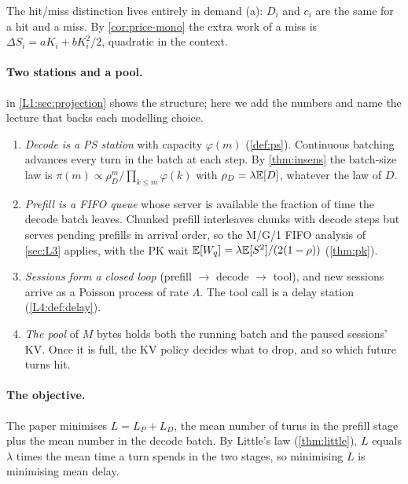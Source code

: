 The hit/miss distinction lives entirely in demand (a): $D_i$ and $c_i$ are
the same for a hit and a miss. By \cref{cor:price-mono} the extra work of a
miss is $\Delta S_i=aK_i+bK_i^2/2$, quadratic in the context.

\paragraph{Two stations and a pool.}  in
\cref{L1:sec:projection} shows the structure; here we add the numbers and
name the lecture that backs each modelling choice.
\begin{enumerate}
\item \emph{Decode is a PS station} with capacity $\varphi(m)$
  (\cref{def:ps}). Continuous batching advances every turn in the batch at
  each step. By \cref{thm:insens} the batch-size law is
  $\pi(m)\propto\rho_D^m/\prod_{k\le m}\varphi(k)$ with $\rho_D=\lambda\mathbb{E}[D]$,
  whatever the law of $D$.
\item \emph{Prefill is a FIFO queue} whose server is available the fraction
  of time the decode batch leaves. Chunked prefill interleaves chunks with
  decode steps but serves pending prefills in arrival order, so the
  M/G/1 FIFO analysis of \cref{sec:L3} applies, with the PK wait
  $\mathbb{E}[W_q]=\lambda\mathbb{E}[S^2]/(2(1-\rho))$ (\cref{thm:pk}).
\item \emph{Sessions form a closed loop} (prefill $\to$ decode $\to$ tool),
  and new sessions arrive as a Poisson process of rate $\Lambda$. The tool
  call is a delay station (\cref{L4:def:delay}).
\item \emph{The pool} of $M$ bytes holds both the running batch and the
  paused sessions' KV. Once it is full, the KV policy decides what to
  drop, and so which future turns hit.
\end{enumerate}

\paragraph{The objective.} The paper minimises $L=L_P+L_D$, the mean number
of turns in the prefill stage plus the mean number in the decode batch. By
Little's law (\cref{thm:little}), $L$ equals $\lambda$ times the mean time a
turn spends in the two stages, so minimising $L$ is minimising mean delay.


